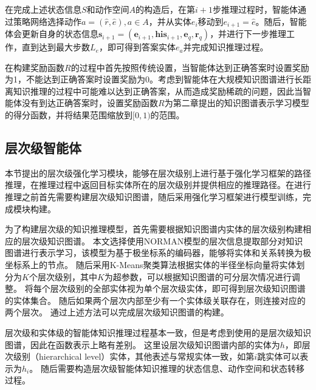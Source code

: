\documentclass[algorithmlist, AutoFakeBold, AutoFakeSlant, figurelist, tablelist, nomlist, engineering]{seuthesix}
\begin{document}
在完成上述状态信息$S$和动作空间$A$的构造后，在第$i+1$步推理过程时，智能体通过策略网络选择动作$a = (\hat{r}, \hat{e}), a \in A$，并从实体$e_i$移动到$e_{i+1} = \hat{e}$。随后，智能体会更新自身的状态信息$\bm{s}_{i+1} = (\bm{e}_{i+1}, \bm{his}_{i+1}, \bm{e}_q, \bm{r}_q)$，并进行下一步推理工作，直到达到最大步数$L_e$，即可得到答案实体$e_a$并完成知识推理过程。

在构建奖励函数$R$的过程中首先按照传统设置，当智能体达到正确答案时设置奖励为1，不能达到正确答案时设置奖励为0。考虑到智能体在大规模知识图谱进行长距离知识推理的过程中可能难以达到正确答案，从而造成奖励稀疏的问题，因此当智能体没有到达正确答案时，设置奖励函数$R$为第二章提出的知识图谱表示学习模型的得分函数，并将结果范围缩放到$[0, 1)$的范围。

\subsection{层次级智能体}
本节提出的层次级强化学习模块，能够在层次级别上进行基于强化学习框架的路径推理，在推理过程中返回目标实体所在的层次级别并提供相应的推理路径。在进行推理之前首先需要构建层次级知识图谱，随后采用强化学习框架进行模型训练，完成模块构建。

为了构建层次级的知识推理模型，首先需要根据知识图谱内实体的层次级别构建相应的层次级知识图谱。
本文选择使用NORMAN模型的层次信息提取部分对知识图谱进行表示学习，该模型为基于极坐标系的编码器，能够将实体和关系转换为极坐标系上的节点。
随后采用K-Means聚类算法根据实体的半径坐标向量将实体划分为$K$个层次级别，其中$K$为超参数，可以根据知识图谱的可分层次情况进行调整。
将每个层次级别的全部实体视为单个层次级实体，即可得到层次级知识图谱的实体集合。
随后如果两个层次内部至少有一个实体级关联存在，则连接对应的两个层次。
通过上述方法可以完成层次级知识图谱的构建。

层次级和实体级的智能体知识推理过程基本一致，但是考虑到使用的是层次级知识图谱，因此在函数表示上略有差别。
这里设层次级知识图谱内部的实体为$h$，即层次级别（hierarchical level）实体，其他表述与常规实体一致，如第$i$跳实体可以表示为$h_i$。
随后需要构造层次级智能体知识推理的状态信息、动作空间和状态转移过程。
\end{document}
